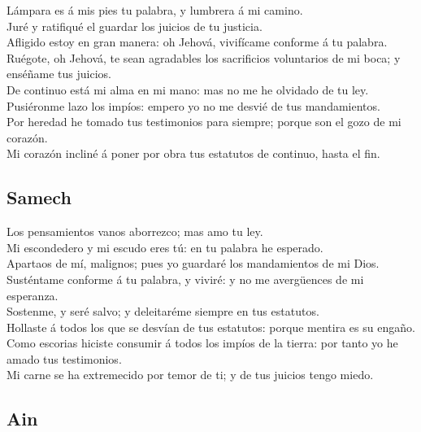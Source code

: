  Lámpara es á mis pies tu palabra, y lumbrera á mi
camino.\\
 Juré y ratifiqué el guardar los juicios de tu justicia.\\
 Afligido estoy en gran manera: oh Jehová, vivifícame
conforme á tu palabra.\\
 Ruégote, oh Jehová, te sean agradables los sacrificios
voluntarios de mi boca; y enséñame tus juicios.\\
 De continuo está mi alma en mi mano: mas no me he
olvidado de tu ley.\\
 Pusiéronme lazo los impíos: empero yo no me desvié de tus
mandamientos.\\
 Por heredad he tomado tus testimonios para siempre;
porque son el gozo de mi corazón.\\
 Mi corazón incliné á poner por obra tus estatutos de
continuo, hasta el fin.

\hypertarget{samech}{%
\subsection{Samech}\label{samech}}

 Los pensamientos vanos aborrezco; mas amo tu ley.\\
 Mi escondedero y mi escudo eres tú: en tu palabra he
esperado.\\
 Apartaos de mí, malignos; pues yo guardaré los
mandamientos de mi Dios.\\
 Susténtame conforme á tu palabra, y viviré: y no me
avergüences de mi esperanza.\\
 Sostenme, y seré salvo; y deleitaréme siempre en tus
estatutos.\\
 Hollaste á todos los que se desvían de tus estatutos:
porque mentira es su engaño.\\
 Como escorias hiciste consumir á todos los impíos de la
tierra: por tanto yo he amado tus testimonios.\\
 Mi carne se ha extremecido por temor de ti; y de tus
juicios tengo miedo.

\hypertarget{ain}{%
\subsection{Ain}\label{ain}}

